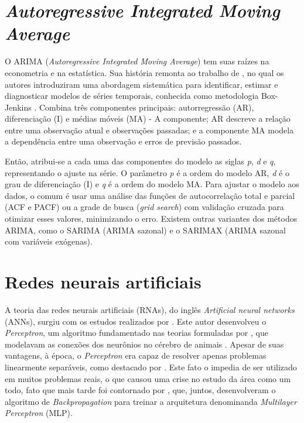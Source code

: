 \section{\textit{Autoregressive Integrated Moving Average}} \label{sec:arima}

O ARIMA (\textit{Autoregressive Integrated Moving Average}) tem suas raízes na econometria e na estatística.
Sua história remonta ao trabalho de \textcite{Box}, no qual os autores introduziram uma abordagem sistemática para identificar, estimar e diagnosticar modelos de séries temporais, conhecida como metodologia Box-Jenkins \cite{Arima}.
Combina três componentes principais: autorregressão (AR), diferenciação (I) e médias móveis (MA) - A componente; AR descreve a relação entre uma observação atual e observações passadas; e a componente MA modela a dependência entre uma observação e erros de previsão passados. 

Então, atribui-se a cada uma das componentes do modelo as siglas \textit{p}, \textit{d} e \textit{q}, representando o ajuste na série. O parâmetro \textit{p} é a ordem do modelo AR, \textit{d} é o grau de diferenciação (I) e \textit{q} é a ordem do modelo MA.
Para ajustar o modelo aos dados, o comum é usar uma análise das funções de autocorrelação total e parcial (ACF e PACF) ou a grade de busca (\textit{grid search}) com validação cruzada para otimizar esses valores, minimizando o erro.
Existem outras variantes dos métodos ARIMA, como o SARIMA (ARIMA sazonal) e o SARIMAX (ARIMA sazonal com variáveis exógenas).
\section{Redes neurais artificiais} \label{sec:redes neurais}

A teoria das redes neurais artificiais (RNAs), do inglês \textit{Artificial neural networks} (ANNs), surgiu com os estudos realizados por \textcite{Rosenblatt}.
Este autor desenvolveu o \textit{Perceptron}, um algoritmo fundamentado nas teorias formuladas por \textcite{McCulloch, hebb}, que modelavam as conexões dos neurônios no cérebro de animais \cite{Good}.
Apesar de suas vantagens, à época, o \textit{Perceptron} era capaz de resolver apenas problemas linearmente separáveis, como destacado por \textcite{Minsky}. Este fato o impedia de ser utilizado em muitos problemas reais,
o que causou uma crise no estudo da área como um todo, fato que mais tarde foi contornado por \textcite{Rumelhart}, que, juntos, desenvolveram o algoritmo de \textit{Backpropagation} para treinar a arquitetura denominanda \textit{Multilayer Perceptron} (MLP).

